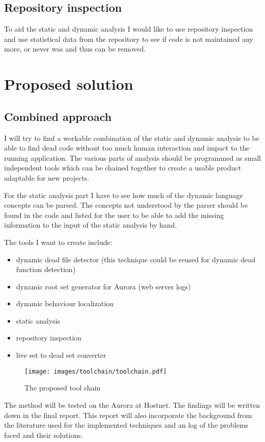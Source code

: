 \documentclass[a4paper,10pt,twocolumn]{article}
\begin{document}
\subsection{Repository inspection}
To aid the static and dynamic analysis I would like to use repository inspection and use statistical data from the repository to see if code is not maintained any more, or never was and thus can be removed.

\section{Proposed solution}
\subsection{Combined approach}
I will try to find a workable combination of the static and dynamic analysis to be able to find dead code without too much human interaction and impact to the running application. The various parts of analysis should be programmed as small independent tools which can be chained together to create a usable product adaptable for new projects.

For the static analysis part I have to see how much of the dynamic language concepts can be parsed. The concepts not understood by the parser should be found in the code and listed for the user to be able to add the missing information to the input of the static analysis by hand.

The tools I want to create include:
\begin{itemize}
\item dynamic dead file detector (this technique could be reused for dynamic dead function detection)
\item dynamic root set generator for Aurora (web server logs)
\item dynamic behaviour localization
\item static analysis
\item repository inspection
\item live set to dead set converter
\end{itemize}

\begin{figure*}
\centering
\texttt{[image: images/toolchain/toolchain.pdf]}
\caption{The proposed tool chain}
\end{figure*}


The method will be tested on the Aurora at Hostnet. The findings will be written down in the final report.
This report will also incorporate the background from the literature used for the implemented techniques and
an log of the problems faced and their solutions.
\end{document}
